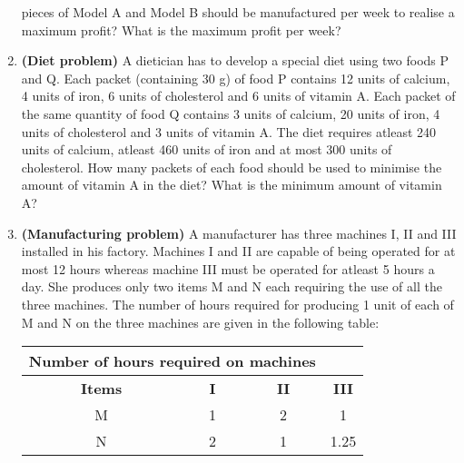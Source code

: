 \begin{enumerate}[label=\arabic*.,ref=\thesection.\theenumi]
pieces of Model A and Model B should be manufactured per week to realise a maximum
profit? What is the maximum profit per week?\\
\item \textbf {(Diet problem)} A dietician has to develop a special diet using two foods
P and Q. Each packet (containing 30 g) of food P contains 12 units of calcium, 4 units
of iron, 6 units of cholesterol and 6 units of vitamin A. Each packet of the same quantity
of food Q contains 3 units of calcium, 20 units of iron, 4 units of cholesterol and 3 units
of vitamin A. The diet requires atleast 240 units of calcium, atleast 460 units of iron and
at most 300 units of cholesterol. How many packets of each food should be used to
minimise the amount of vitamin A in the diet? What is the minimum amount of vitamin A?\\
\item \textbf{(Manufacturing problem)} A manufacturer has three machines I, II
and III installed in his factory. Machines I and II are capable of being operated for
at most 12 hours whereas machine III must be operated for atleast 5 hours a day. She
produces only two items M and N each requiring the use of all the three machines.
The number of hours required for producing 1 unit of each of M and N on the three
machines are given in the following table:\\

\begin{tabular}{|c|c|c|c|}
\hline
 \multicolumn{3}{|l}{\textbf{ Number of hours required on machines}}& \\ \cline{2-4}
\hline
\textbf {Items}&\textbf{I}&\textbf{II}&\textbf{III}\\
\hline
M&1&2&1\\
\hline
 N&2&1&1.25\\
 \hline 

\end{tabular}


\end{enumerate}
